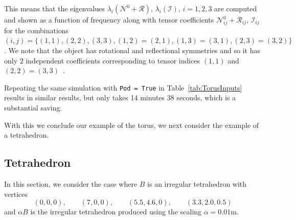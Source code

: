\noindent
This means that the eigenvalues $\lambda_i(\mathcal{N}^0+\mathcal{R})$, $\lambda_i(\mathcal{I})$, $i=1,2,3$ are computed and shown as a function of frequency along with tensor coefficients $\mathcal{N}^0_{ij}+\mathcal{R}_{ij}$, $\mathcal{I}_{ij}$ for the combinations $(i,j) =\{ (1,1), (2,2), (3,3),(1,2)=(2,1), (1,3)=(3,1), (2,3)=(3,2)\}$. We note that the object has rotational and reflectional symmetries and so it has only $2$ independent coefficients corresponding to tensor indices  
$(1,1)$ and $(2,2)=(3,3)$~\cite{LedgerLionheart2015,LedgerLionheart2016}. 

Repeating the same simulation with  \texttt{Pod = True} in Table~\ref{tab:TorusInputs} results in similar results, but only takes 14 minutes 38 seconds, which is a substantial saving. 


With this we conclude our example of the torus, we next consider the example of a tetrahedron.


\subsection{Tetrahedron}
In this section, we consider the case where $B$ is an irregular tetrahedron with vertices 
\begin{equation}
(0,0,0),  \qquad (7,0,0), \qquad  (5.5, 4.6,0), \qquad (3.3, 2.0, 0.5)
\nonumber
\end{equation}
and $\alpha B$ is the irregular tetrahedron produced using the scaling $\alpha=0.01\text{m}$.

